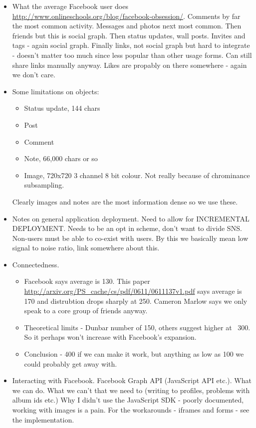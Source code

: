 \begin{itemize}

   
    \item What the average Facebook user does \url{http://www.onlineschools.org/blog/facebook-obsession/}. Comments by far the most common activity. Messages and photos next most common. Then friends  but this is social graph. Then status updates, wall posts. Invites and tags - again social graph. Finally links, not social graph but hard to integrate - doesn't matter too much since less popular than other usage forms. Can still share links manually anyway. Likes are propably on there somewhere - again we don't care.
    
    \item Some limitations on objects: 
    \begin{itemize}
        \item Status update, 144 chars
        \item Post
        \item Comment
        \item Note, 66,000 chars or so
        \item Image, 720x720 3 channel 8 bit colour. Not really because of chrominance subsampling.
    \end{itemize}
    Clearly images and notes are the most information dense so we use these.


    \item Notes on general application deployment. Need to allow for INCREMENTAL DEPLOYMENT. Needs to be an opt in scheme, don't want to divide SNS. Non-users must be able to co-exist with users. By this we basically mean low signal to noise ratio, link somewhere about this.
    
    \item Connectedness.
    \begin{itemize}
        \item Facebook says average is 130. This paper \url{http://arxiv.org/PS_cache/cs/pdf/0611/0611137v1.pdf} says average is 170 and distrubtion drops sharply at 250. Cameron Marlow says we only speak to a core group of friends anyway.
        \item Theoretical limits - Dunbar number of 150, others suggest higher at ~300. So it perhaps won't increase with Facebook's expansion.
        \item Conclusion - 400 if we can make it work, but anything as low as 100 we could probably get away with.
    \end{itemize}
    
    \item Interacting with Facebook. Facebook Graph API (JavaScript API etc.). What we can do. What we can't that we need to (writing to profiles, problems with album ids etc.) Why I didn't use the JavaScript SDK - poorly documented, working with images is a pain. For the workarounds - iframes and forms - see the implementation.

\end{itemize}
    

